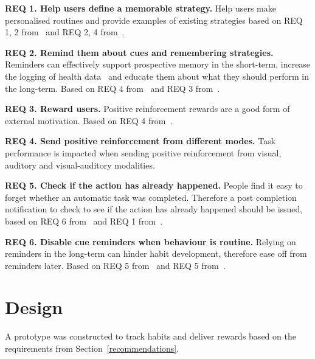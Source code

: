 \textbf{REQ 1. Help users define a memorable strategy.}\newline
Help users make personalised routines and provide examples of existing strategies based on REQ 1, 2 from~\cite{article_beyond_self_tracking_designing_apps} and REQ 2, 4 from~\cite{article_taxonomy_motivational_affordances_meaningful}.

\textbf{REQ 2. Remind them about cues and remembering strategies.}\newline
Reminders can effectively support prospective memory in the short-term, increase the logging of health data~\cite{the_power_of_logging_mobile_notifications} and educate them about what they should perform in the long-term. Based on REQ 4 from~\cite{article_beyond_self_tracking_designing_apps} and REQ 3 from~\cite{article_taxonomy_motivational_affordances_meaningful}.

\textbf{REQ 3. Reward users.}\newline
Positive reinforcement rewards are a good form of external motivation. Based on REQ 4 from~\cite{article_taxonomy_motivational_affordances_meaningful}.

\textbf{REQ 4. Send positive reinforcement from different modes.}\newline
Task performance is impacted when sending positive reinforcement from visual, auditory and visual-auditory modalities.

\textbf{REQ 5. Check if the action has already happened.}\newline
People find it easy to forget whether an automatic task was completed. Therefore a post completion notification to check to see if the action has already happened should be issued, based on REQ 6 from~\cite{article_beyond_self_tracking_designing_apps} and REQ 1 from~\cite{article_taxonomy_motivational_affordances_meaningful}.

\textbf{REQ 6. Disable cue reminders when behaviour is routine.}\newline
Relying on reminders in the long-term can hinder habit development, therefore ease off from reminders later. Based on REQ 5 from~\cite{article_beyond_self_tracking_designing_apps} and REQ 5 from~\cite{article_taxonomy_motivational_affordances_meaningful}.


\newpage
\section{Design}
A prototype was constructed to track habits and deliver rewards based on the requirements from Section~\ref{recommendations}.

